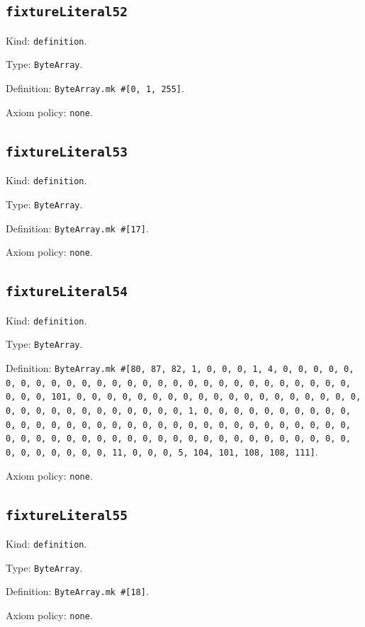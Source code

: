 \documentclass[11pt]{article}
\begin{document}
\subsection*{\texttt{fixtureLiteral52}}
\noindent Kind: \texttt{definition}.\par
\noindent Type: \texttt{ByteArray}.\par
\noindent Definition: \texttt{ByteArray.mk \#[0, 1, 255]}.\par
\noindent Axiom policy: \texttt{none}.\par
\subsection*{\texttt{fixtureLiteral53}}
\noindent Kind: \texttt{definition}.\par
\noindent Type: \texttt{ByteArray}.\par
\noindent Definition: \texttt{ByteArray.mk \#[17]}.\par
\noindent Axiom policy: \texttt{none}.\par
\subsection*{\texttt{fixtureLiteral54}}
\noindent Kind: \texttt{definition}.\par
\noindent Type: \texttt{ByteArray}.\par
\noindent Definition: \texttt{ByteArray.mk \#[80, 87, 82, 1, 0, 0, 0, 1, 4, 0, 0, 0, 0, 0, 0, 0, 0, 0, 0, 0, 0, 0, 0, 0, 0, 0, 0, 0, 0, 0, 0, 0, 0, 0, 0, 0, 0, 0, 0, 0, 101, 0, 0, 0, 0, 0, 0, 0, 0, 0, 0, 0, 0, 0, 0, 0, 0, 0, 0, 0, 0, 0, 0, 0, 0, 0, 0, 0, 0, 0, 0, 0, 1, 0, 0, 0, 0, 0, 0, 0, 0, 0, 0, 0, 0, 0, 0, 0, 0, 0, 0, 0, 0, 0, 0, 0, 0, 0, 0, 0, 0, 0, 0, 0, 0, 0, 0, 0, 0, 0, 0, 0, 0, 0, 0, 0, 0, 0, 0, 0, 0, 0, 0, 0, 0, 0, 0, 0, 0, 0, 0, 0, 0, 0, 0, 0, 11, 0, 0, 0, 5, 104, 101, 108, 108, 111]}.\par
\noindent Axiom policy: \texttt{none}.\par
\subsection*{\texttt{fixtureLiteral55}}
\noindent Kind: \texttt{definition}.\par
\noindent Type: \texttt{ByteArray}.\par
\noindent Definition: \texttt{ByteArray.mk \#[18]}.\par
\noindent Axiom policy: \texttt{none}.\par
\end{document}
